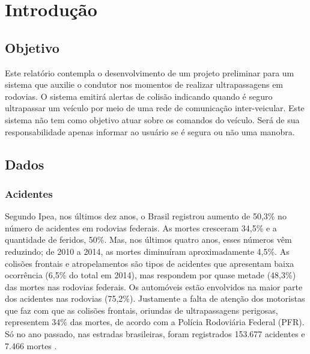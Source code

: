 \chapter[Introdução]{Introdução}

\section{Objetivo}
Este relatório contempla o desenvolvimento de um projeto preliminar para um sistema que auxilie o condutor nos momentos de
realizar ultrapassagens em rodovias. O sistema emitirá alertas de colisão indicando quando é seguro ultrapassar um veículo
por meio de uma rede de comunicação inter-veicular. Este sistema não tem como objetivo atuar sobre os comandos do veículo.
Será de sua responsabilidade apenas informar ao usuário se é segura ou não uma manobra.

\section{Dados}

\subsection{Acidentes}

Segundo Ipea, nos últimos dez anos, o Brasil registrou aumento de 50,3\% no número de acidentes em rodovias federais. As mortes cresceram 34,5\% e a quantidade de feridos, 50\%. Mas, nos últimos quatro anos, esses números vêm reduzindo; de 2010 a 2014, as mortes diminuíram aproximadamente 4,5\%.
As colisões frontais e atropelamentos são tipos de acidentes que apresentam baixa ocorrência (6,5\% do total em 2014), mas respondem por quase metade (48,3\%) das mortes nas rodovias federais.
Os automóveis estão envolvidos na maior parte dos acidentes nas rodovias (75,2\%). Justamente a falta de atenção dos motoristas que faz com que as colisões frontais, oriundas de ultrapassagens perigosas, representem 34\% das mortes, de acordo com a Polícia Rodoviária Federal (PFR). Só no ano passado, nas estradas brasileiras, foram registrados 153.677 acidentes e 7.466 mortes \cite{ipea}.

